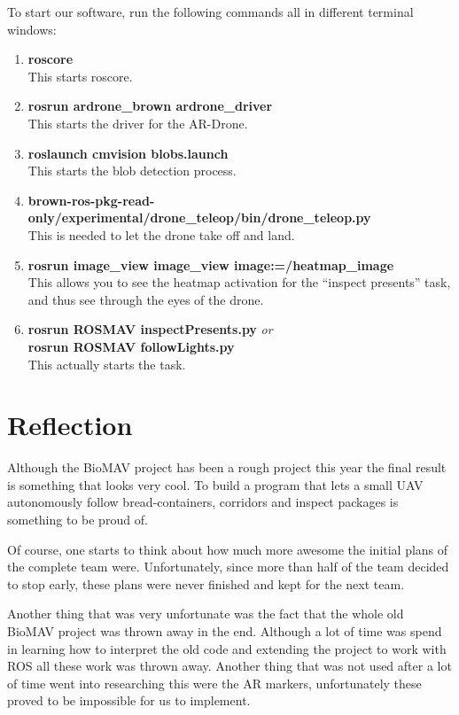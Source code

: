 \documentclass[a4paper,10pt]{article}
\begin{document}
To start our software, run the following commands all in different terminal windows:
\begin{enumerate}
\item \textbf{roscore} \\ This starts roscore.
\item \textbf{rosrun ardrone\_brown ardrone\_driver} \\ This starts the driver for the AR-Drone.
\item \textbf{roslaunch cmvision blobs.launch} \\ This starts the blob detection process.
\item \textbf{brown-ros-pkg-read-only/experimental/drone\_teleop/bin/drone\_teleop.py} \\ This is needed to let the drone take off and land.
\item \textbf{rosrun image\_view image\_view image:=/heatmap\_image} \\ This
      allows you to see the heatmap activation for the ``inspect presents''
      task, and thus see through the eyes of the drone.
\item \textbf{rosrun ROSMAV inspectPresents.py} \textit{or} \\
      \textbf{rosrun ROSMAV followLights.py} \\
      This actually starts the task. 
\end{enumerate}


\section{Reflection}

Although the BioMAV project has been a rough project this year the final result is something that looks very cool. 
To build a program that lets a small UAV autonomously follow bread-containers, corridors and inspect packages is something to be proud of. 

Of course, one starts to think about how much more awesome the initial plans of the complete team were. 
Unfortunately, since more than half of the team decided to stop early, these plans were never finished and kept for the next team. 

Another thing that was very unfortunate was the fact that the whole old BioMAV project was thrown away in the end. 
Although a lot of time was spend in learning how to interpret the old code and extending the project to work with ROS all these work was thrown away. 
Another thing that was not used after a lot of time went into researching this were the AR markers, unfortunately these proved to be impossible for us to implement. 
\end{document}
